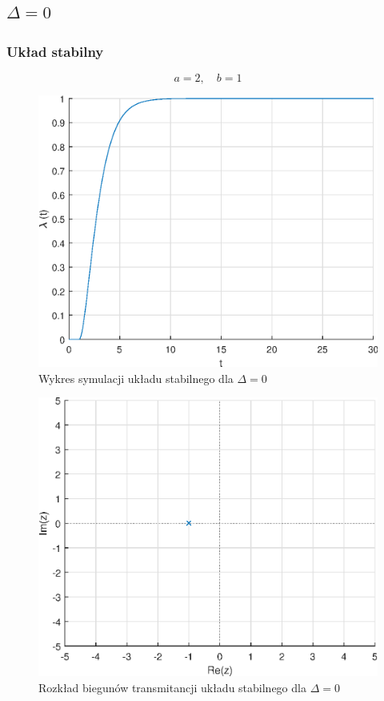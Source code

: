 \documentclass[a4paper]{article}
\begin{document}
\subsection{$\Delta = 0$}
\subsubsection{Układ stabilny}
$$
a=2,\quad b=1
$$
\begin{figure}[H]
    \centering
    \includegraphics[scale=0.6]{b1.eps}
    \caption{Wykres symulacji układu stabilnego dla $\Delta=0$}
\end{figure}
\begin{figure}[H]
    \centering
    \includegraphics[scale=0.6]{b1_z.eps}
    \caption{Rozkład biegunów transmitancji układu stabilnego dla $\Delta=0$}
\end{figure}
\end{document}
